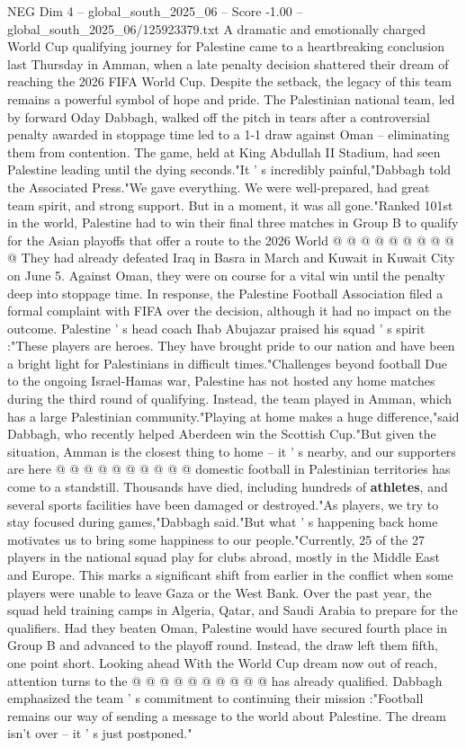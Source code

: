 \begin{textsample}{NEG Dim 4 – global\_south\_2025\_06 – Score -1.00 – global\_south\_2025\_06/125923379.txt}  \label{ex:f4_neg_101}
A dramatic and emotionally charged World Cup qualifying journey for Palestine came to a heartbreaking conclusion last Thursday in Amman, when a late penalty decision shattered their dream of reaching the 2026 FIFA World Cup.
Despite the setback, the legacy of this team remains a powerful symbol of hope and pride.
The Palestinian national team, led by forward Oday Dabbagh, walked off the pitch in tears after a controversial penalty awarded in stoppage time led to a 1-1 draw against Oman -- eliminating them from contention.
The game, held at King Abdullah II Stadium, had seen Palestine leading until the dying seconds."It ' s incredibly painful,"Dabbagh told the Associated Press."We gave everything.
We were well-prepared, had great team spirit, and strong support.
But in a moment, it was all gone."Ranked 101st in the world, Palestine had to win their final three matches in Group B to qualify for the Asian playoffs that offer a route to the 2026 World @ @ @ @ @ @ @ @ @ @ They had already defeated Iraq in Basra in March and Kuwait in Kuwait City on June 5.
Against Oman, they were on course for a vital win until the penalty deep into stoppage time.
In response, the Palestine Football Association filed a formal complaint with FIFA over the decision, although it had no impact on the outcome.
Palestine ' s head coach Ihab Abujazar praised his squad ' s spirit :"These players are heroes.
They have brought pride to our nation and have been a bright light for Palestinians in difficult times."Challenges beyond football Due to the ongoing Israel-Hamas war, Palestine has not hosted any home matches during the third round of qualifying.
Instead, the team played in Amman, which has a large Palestinian community."Playing at home makes a huge difference,"said Dabbagh, who recently helped Aberdeen win the Scottish Cup."But given the situation, Amman is the closest thing to home -- it ' s nearby, and our supporters are here @ @ @ @ @ @ @ @ @ @ domestic football in Palestinian territories has come to a standstill.
Thousands have died, including hundreds of \textbf{athletes}, and several sports facilities have been damaged or destroyed."As players, we try to stay focused during games,"Dabbagh said."But what ' s happening back home motivates us to bring some happiness to our people."Currently, 25 of the 27 players in the national squad play for clubs abroad, mostly in the Middle East and Europe.
This marks a significant shift from earlier in the conflict when some players were unable to leave Gaza or the West Bank.
Over the past year, the squad held training camps in Algeria, Qatar, and Saudi Arabia to prepare for the qualifiers.
Had they beaten Oman, Palestine would have secured fourth place in Group B and advanced to the playoff round.
Instead, the draw left them fifth, one point short.
Looking ahead With the World Cup dream now out of reach, attention turns to the @ @ @ @ @ @ @ @ @ @ has already qualified.
Dabbagh emphasized the team ' s commitment to continuing their mission :"Football remains our way of sending a message to the world about Palestine.
The dream isn't over -- it ' s just postponed."

\end{textsample}
